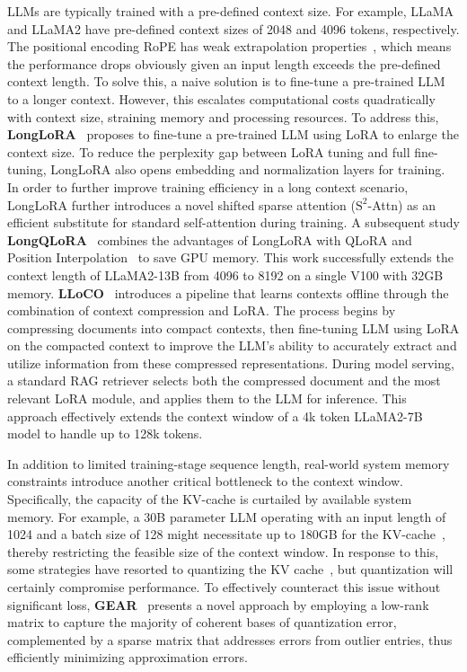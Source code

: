 LLMs are typically trained with a pre-defined context size. For example, LLaMA and LLaMA2 have pre-defined context sizes of 2048 and 4096 tokens, respectively. 
The positional encoding RoPE has weak extrapolation properties~\cite{chen2023extending}, which means the performance drops obviously given an input length exceeds the pre-defined context length.
To solve this, a naive solution is to fine-tune a pre-trained LLM to a longer context. However, this escalates computational costs quadratically with context size, straining memory and processing resources.
To address this, \textbf{LongLoRA}~\cite{longlora} proposes to fine-tune a pre-trained LLM using LoRA to enlarge the context size. To reduce the perplexity gap between LoRA tuning and full fine-tuning, LongLoRA also opens embedding and normalization layers for training. In order to further improve training efficiency in a long context scenario, LongLoRA further introduces a novel shifted sparse attention ($\text{S}^2$-Attn) as an efficient substitute for standard self-attention during training.
A subsequent study \textbf{LongQLoRA}~\cite{yang2023longqlora} combines the advantages of LongLoRA with QLoRA and Position Interpolation~\cite{rotationEmbedding} to save GPU memory. This work successfully extends the context length of LLaMA2-13B from 4096 to 8192 on a single V100 with 32GB memory.
\textbf{LLoCO}~\cite{tan2024lloco} introduces a pipeline that learns contexts offline through the combination of context compression and LoRA. The process begins by compressing documents into compact contexts, then fine-tuning LLM using LoRA on the compacted context to improve the LLM’s ability to accurately extract and utilize information from these compressed representations. During model serving, a standard RAG retriever selects both the compressed document and the most relevant LoRA module, and applies them to the LLM for inference. This approach effectively extends the context window of a 4k token LLaMA2-7B model to handle up to 128k tokens.


In addition to limited training-stage sequence length, real-world system memory constraints introduce another critical bottleneck to the context window. Specifically, the capacity of the KV-cache is curtailed by available system memory. For example, a 30B parameter LLM operating with an input length of 1024 and a batch size of 128 might necessitate up to 180GB for the KV-cache~\cite{zhang2024h2o}, thereby restricting the feasible size of the context window. In response to this, some strategies have resorted to quantizing the KV cache~\cite{flexgen, dettmers2022gpt3}, but quantization will certainly compromise performance. To effectively counteract this issue without significant loss, \textbf{GEAR}~\cite{kang2024gear} presents a novel approach by employing a low-rank matrix to capture the majority of coherent bases of quantization error, complemented by a sparse matrix that addresses errors from outlier entries, thus efficiently minimizing approximation errors.



